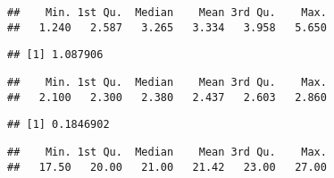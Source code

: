 \documentclass[
]{article}
\newenvironment{Shaded}{\begin{snugshade}}{\end{snugshade}}
\newcommand{\DataTypeTok}[1]{\textcolor[rgb]{0.13,0.29,0.53}{#1}}
\newcommand{\KeywordTok}[1]{\textcolor[rgb]{0.13,0.29,0.53}{\textbf{#1}}}
\newcommand{\NormalTok}[1]{#1}
\newcommand{\OperatorTok}[1]{\textcolor[rgb]{0.81,0.36,0.00}{\textbf{#1}}}
\newcommand{\StringTok}[1]{\textcolor[rgb]{0.31,0.60,0.02}{#1}}
\begin{document}
\begin{verbatim}
##    Min. 1st Qu.  Median    Mean 3rd Qu.    Max. 
##   1.240   2.587   3.265   3.334   3.958   5.650
\end{verbatim}

\begin{Shaded}
\end{Shaded}

\begin{verbatim}
## [1] 1.087906
\end{verbatim}

\begin{Shaded}
\end{Shaded}

\begin{verbatim}
##    Min. 1st Qu.  Median    Mean 3rd Qu.    Max. 
##   2.100   2.300   2.380   2.437   2.603   2.860
\end{verbatim}

\begin{Shaded}
\end{Shaded}

\begin{verbatim}
## [1] 0.1846902
\end{verbatim}

\begin{Shaded}
\end{Shaded}

\begin{verbatim}
##    Min. 1st Qu.  Median    Mean 3rd Qu.    Max. 
##   17.50   20.00   21.00   21.42   23.00   27.00
\end{verbatim}

\begin{Shaded}
\end{Shaded}
\end{document}

